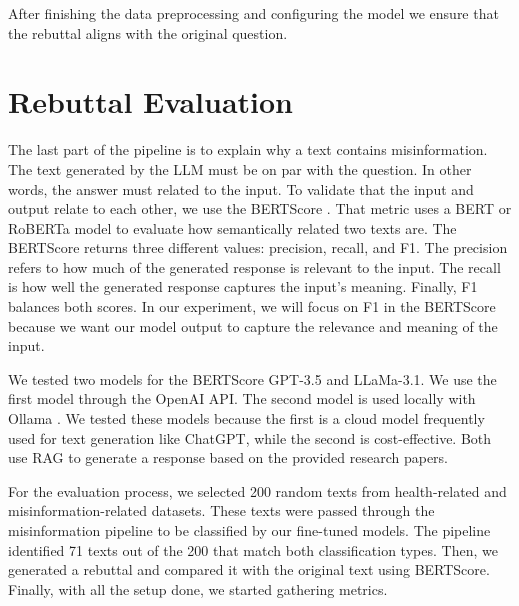 After finishing the data preprocessing and configuring the model we ensure that the rebuttal aligns with the original question. 

\section{Rebuttal Evaluation}
The last part of the pipeline is to explain why a text contains misinformation. The text generated by the LLM must be on par with the question. In other words, the answer must related to the input. To validate that the input and output relate to each other, we use the BERTScore
\cite{zhang2020bertscoreevaluatingtextgeneration}. That metric uses a BERT or RoBERTa model to evaluate how semantically related two texts are. The BERTScore returns three different values: precision, recall, and F1. The precision refers to how much of the generated response is relevant to the input. The recall is how well the generated response captures the input’s meaning. Finally, F1 balances both scores. In our experiment, we will focus on F1 in the BERTScore because we want our model output to capture the relevance and meaning of the input.

We tested two models for the BERTScore GPT-3.5 and LLaMa-3.1. We use the first model through the OpenAI \cite{openai} API. The second model is used locally with Ollama \cite{ollama}. We tested these models because the first is a cloud model frequently used for text generation like ChatGPT, while the second is cost-effective. Both use RAG to generate a response based on the provided research papers.

For the evaluation process, we selected 200 random texts from health-related and misinformation-related datasets. These texts were passed through the misinformation pipeline to be classified by our fine-tuned models. The pipeline identified 71 texts out of the 200 that match both classification types. Then, we generated a rebuttal and compared it with the original text using BERTScore. Finally, with all the setup done, we started gathering metrics.










